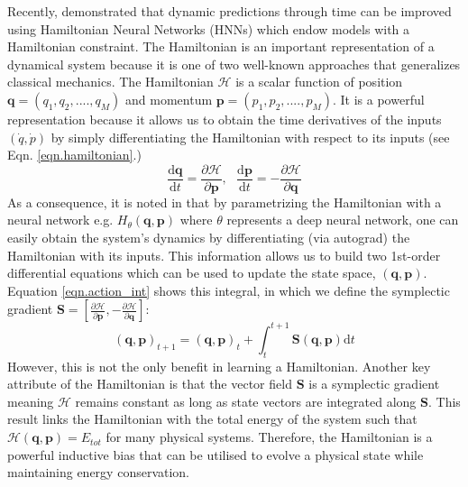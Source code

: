 \documentclass[twoside]{article}
\begin{document}
Recently, \cite{greydanus_hamiltonian_2019} demonstrated that dynamic predictions through time can be improved using Hamiltonian Neural Networks (HNNs) which endow models with a Hamiltonian constraint. The Hamiltonian is an important representation of a dynamical system because it is one of two well-known approaches that generalizes classical mechanics. The Hamiltonian $\mathcal{H}$ is a scalar function of position $\mathbf{q} = (q_1,q_2,....,q_M)$ and momentum $\mathbf{p} = (p_1,p_2,....,p_M)$. It is a powerful representation because it allows us to obtain the time derivatives of the inputs $(\dot{q},\dot{p})$ by simply differentiating the Hamiltonian with respect to its inputs (see Eqn. \ref{eqn.hamiltonian}.)
\begin{equation}
\frac{\mathrm{d}\mathbf{q}}{\mathrm{d}t} = \frac{\partial \mathcal{H}}{\partial \mathbf{p}}, ~~~
\frac{\mathrm{d}\mathbf{p}}{\mathrm{d}t} = -\frac{\partial \mathcal{H}}{\partial \mathbf{q}}
\label{eqn.hamiltonian}
\end{equation}
As a consequence, it is noted in \cite{greydanus_hamiltonian_2019} that by parametrizing the Hamiltonian with a neural network e.g. $H_{\theta}(\mathbf{q},\mathbf{p})$ where $\theta$ represents a deep neural network, one can easily obtain the system's dynamics by differentiating (via autograd) the Hamiltonian with its inputs. This information allows us to build two 1st-order differential equations which can be used to update the state space, $(\mathbf{q},\mathbf{p})$. Equation \ref{eqn.action_int} shows this integral, in which we define the symplectic gradient $\mathbf{S}  = \left [ \frac{\partial \mathcal{H}}{\partial \mathbf{p}},-\frac{\partial \mathcal{H}}{\partial \mathbf{q}} \right ] $:
\begin{equation}
(\mathbf{q},\mathbf{p})_{t+1} = (\mathbf{q},\mathbf{p})_t + \int_t^{t+1} \mathbf{S}(\mathbf{q},\mathbf{p}) \mathrm{d}t
\label{eqn.action_int}
\end{equation}
However, this is not the only benefit in learning a Hamiltonian. Another key attribute of the Hamiltonian is that the vector field $\mathbf{S}$ is a symplectic gradient meaning $\mathcal{H}$ remains constant as long as state vectors are integrated along $\mathbf{S}$. This result links the Hamiltonian with the total energy of the system such that $\mathcal{H}(\mathbf{q},\mathbf{p}) = E_{tot}$ for many physical systems. Therefore, the Hamiltonian is a powerful inductive bias that can be utilised to evolve a physical state while maintaining energy conservation. 
\end{document}
